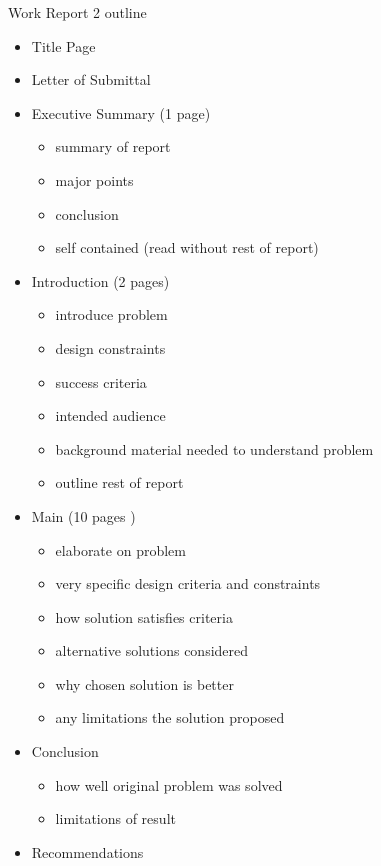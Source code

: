 \documentclass[12pt]{article}
\begin{document}
    Work Report 2 outline
    \begin{itemize}
        \item Title Page
        \item Letter of Submittal
        \item Executive Summary (1 page)
        \begin{itemize}
            \item summary of report
            \item major points
            \item conclusion
            \item self contained (read without rest of report)
        \end{itemize}
        \item Introduction (2 pages)
        \begin{itemize}
            \item introduce problem
            \item design constraints
            \item success criteria
            \item intended audience
            \item background material needed to understand problem
            \item outline rest of report
        \end{itemize}
        \item Main (10 pages )
        \begin{itemize}
            \item elaborate on problem
            \item very specific design criteria and constraints
            \item how solution satisfies criteria
            \item alternative solutions considered
            \item why chosen solution is better
            \item any limitations the solution proposed
        \end{itemize}
        \item Conclusion
        \begin{itemize}
            \item how well original problem was solved
            \item limitations of result
        \end{itemize}
        \item Recommendations

\end{itemize}
\end{document}
